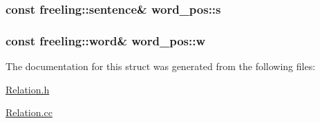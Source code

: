 \subsubsection[{s}]{\setlength{\rightskip}{0pt plus 5cm}const freeling\+::sentence\& word\+\_\+pos\+::s}\label{structword__pos_a18b13ee20fa43f3e038f76202f5e2f6e}
\hypertarget{structword__pos_a9268eca742d764f0900d4bfcf7c2720e}{}
\subsubsection[{w}]{\setlength{\rightskip}{0pt plus 5cm}const freeling\+::word\& word\+\_\+pos\+::w}\label{structword__pos_a9268eca742d764f0900d4bfcf7c2720e}


The documentation for this struct was generated from the following files\+:\begin{DoxyCompactItemize}
\item 
\hyperlink{Relation_8h}{Relation.\+h}\item 
\hyperlink{Relation_8cc}{Relation.\+cc}\end{DoxyCompactItemize}
